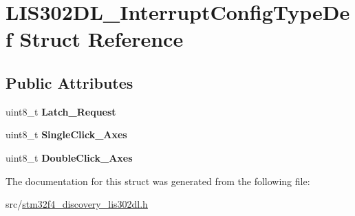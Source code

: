 \hypertarget{struct_l_i_s302_d_l___interrupt_config_type_def}{\section{L\-I\-S302\-D\-L\-\_\-\-Interrupt\-Config\-Type\-Def Struct Reference}
\label{struct_l_i_s302_d_l___interrupt_config_type_def}
}
\subsection*{Public Attributes}
\begin{DoxyCompactItemize}
\item 
\hypertarget{struct_l_i_s302_d_l___interrupt_config_type_def_a25f6f0041611df93a3fda1fa517b8cf5}{uint8\-\_\-t {\bfseries Latch\-\_\-\-Request}}\label{struct_l_i_s302_d_l___interrupt_config_type_def_a25f6f0041611df93a3fda1fa517b8cf5}

\item 
\hypertarget{struct_l_i_s302_d_l___interrupt_config_type_def_ab218a0ab9e72a8a4e1bae6161a111eb6}{uint8\-\_\-t {\bfseries Single\-Click\-\_\-\-Axes}}\label{struct_l_i_s302_d_l___interrupt_config_type_def_ab218a0ab9e72a8a4e1bae6161a111eb6}

\item 
\hypertarget{struct_l_i_s302_d_l___interrupt_config_type_def_a40ee3443180fecc2ea5cc5f519644132}{uint8\-\_\-t {\bfseries Double\-Click\-\_\-\-Axes}}\label{struct_l_i_s302_d_l___interrupt_config_type_def_a40ee3443180fecc2ea5cc5f519644132}

\end{DoxyCompactItemize}


The documentation for this struct was generated from the following file\-:\begin{DoxyCompactItemize}
\item 
src/\hyperlink{stm32f4__discovery__lis302dl_8h}{stm32f4\-\_\-discovery\-\_\-lis302dl.\-h}\end{DoxyCompactItemize}
